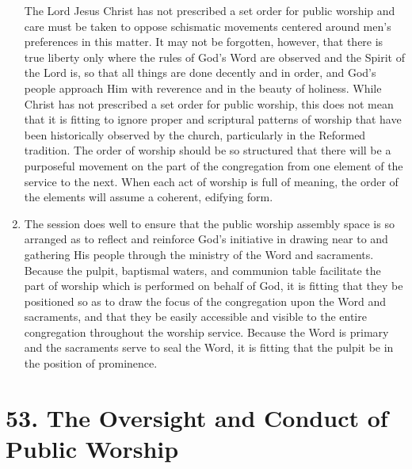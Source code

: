 \documentclass[
]{book}
\begin{document}
\begin{enumerate}
  The Lord Jesus Christ has not prescribed a set order for public worship and care must be taken to oppose schismatic movements centered around men's preferences in this matter. It may not be forgotten, however, that there is true liberty only where the rules of God's Word are observed and the Spirit of the Lord is, so that all things are done decently and in order, and God's people approach Him with reverence and in the beauty of holiness. While Christ has not prescribed a set order for public worship, this does not mean that it is fitting to ignore proper and scriptural patterns of worship that have been historically observed by the church, particularly in the Reformed tradition. The order of worship should be so structured that there will be a purposeful movement on the part of the congregation from one element of the service to the next. When each act of worship is full of meaning, the order of the elements will assume a coherent, edifying form.
\item
  The session does well to ensure that the public worship assembly space is so arranged as to reflect and reinforce God's initiative in drawing near to and gathering His people through the ministry of the Word and sacraments. Because the pulpit, baptismal waters, and communion table facilitate the part of worship which is performed on behalf of God, it is fitting that they be positioned so as to draw the focus of the congregation upon the Word and sacraments, and that they be easily accessible and visible to the entire congregation throughout the worship service. Because the Word is primary and the sacraments serve to seal the Word, it is fitting that the pulpit be in the position of prominence.
\end{enumerate}

\hypertarget{the-oversight-and-conduct-of-public-worship}{%
\section*{53. The Oversight and Conduct of Public Worship}\label{the-oversight-and-conduct-of-public-worship}}

\protect\hypertarget{chapter-slug-53-the-oversight-and-conduct-of-public-worship}{\href{}{}}
\end{document}
